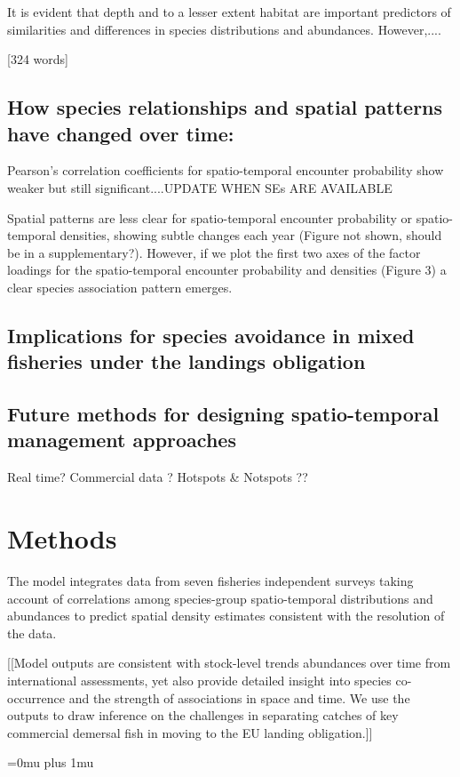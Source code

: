 \documentclass{nature}
\begin{document}
\begin{linenumbers}
It is evident that depth and to a lesser extent habitat are important
predictors of similarities and differences in species distributions and
abundances. However,....

[324 words]

\subsection{How species relationships and spatial patterns have changed over
	time:}
Pearson's correlation coefficients for spatio-temporal encounter probability
show weaker but still significant....UPDATE WHEN SEs ARE AVAILABLE

Spatial patterns are less clear for spatio-temporal encounter probability or
spatio-temporal densities, showing subtle changes each year (Figure not shown,
should be in a supplementary?). However, if we plot the first two axes of the
factor loadings for the spatio-temporal encounter probability and densities
(Figure 3) a clear species association pattern emerges. 

\subsection{Implications for species avoidance in mixed fisheries under the
	landings obligation}

\subsection{Future methods for designing spatio-temporal management approaches}

Real time?  Commercial data ?  Hotspots \& Notspots ??

\section*{Methods}

The model integrates data from seven fisheries independent surveys taking
account of correlations among species-group spatio-temporal distributions and
abundances to predict spatial density estimates consistent with the resolution
of the data. 

[[Model outputs are consistent with stock-level trends abundances over time
from international assessments, yet also provide detailed insight into species
co-occurrence and the strength of associations in space and time.  We use the
outputs to draw inference on the challenges in separating catches of key
commercial demersal fish in moving to the EU landing obligation.]]



\end{linenumbers}
\newpage
\Urlmuskip=0mu plus 1mu\relax

\small{}
\end{document}
